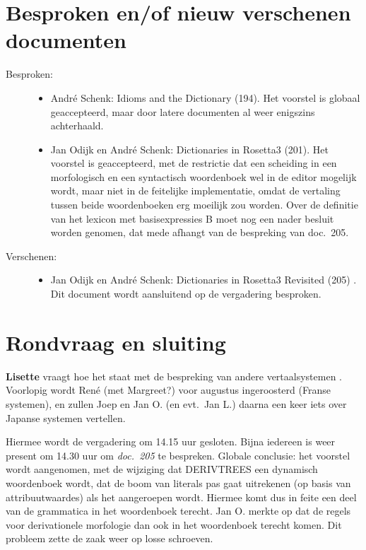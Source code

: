 \section{Besproken en/of nieuw verschenen documenten}
\begin{description}
\item [Besproken:]\mbox{}
  \begin{itemize}
  \item Andr\'{e} Schenk: Idioms and the Dictionary (194). Het voorstel is globaal 
geaccepteerd, maar door latere documenten al weer enigszins achterhaald.
  \item Jan Odijk en Andr\'{e} Schenk: Dictionaries in Rosetta3 (201). Het 
voorstel is geaccepteerd, met de restrictie dat een scheiding in een 
morfologisch en een syntactisch woordenboek wel in de editor mogelijk wordt, 
maar niet in de feitelijke implementatie, omdat de vertaling tussen beide 
woordenboeken erg moeilijk zou worden. Over de definitie van het lexicon met 
basisexpressies B moet nog een nader besluit worden genomen, dat mede afhangt 
van de bespreking van doc.\ 205.
  \end{itemize}
\item [Verschenen:] \mbox{}
  \begin{itemize}
  \item Jan Odijk en Andr\'{e} Schenk: Dictionaries in Rosetta3 Revisited (205)
. Dit document wordt aansluitend op de vergadering besproken.
  \end{itemize}
\end{description}

\section{Rondvraag en sluiting}
{\bf Lisette} vraagt hoe het staat met de bespreking van andere vertaalsystemen
. Voorlopig wordt Ren\'{e} (met Margreet?) voor augustus ingeroosterd (Franse 
systemen), en zullen Joep en Jan O. (en evt.\ Jan L.) daarna een keer iets over 
Japanse systemen vertellen.

Hiermee wordt de vergadering om 14.15 uur gesloten. Bijna iedereen is weer present 
om 14.30 uur om {\em doc.\ 205} te bespreken. Globale conclusie: het voorstel wordt 
aangenomen, met de wijziging dat DERIVTREES een dynamisch woordenboek wordt, 
dat de boom van literals pas gaat uitrekenen (op basis van attribuutwaardes) 
als het aangeroepen wordt. Hiermee komt dus in feite een deel van de grammatica 
in het woor\-den\-boek terecht. Jan O. merkte op dat de regels voor 
derivationele morfologie dan ook in het woordenboek terecht komen. Dit probleem 
zette de zaak weer op losse schroeven.



